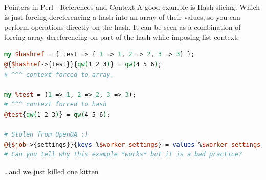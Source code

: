 \documentclass[10pt]{beamer}
\begin{document}
\begin{frame}[fragile]{Pointers in Perl - References and Context}
A good example is Hash slicing. Which is just forcing dereferencing a hash into an array of their values, so you can perform operations directly on the hash. It can be seen as a combination of forcing array dereferencing on part of the hash while imposing list context.

\begin{lstlisting}[language=perl]
my $hashref = { test => { 1 => 1, 2 => 2, 3 => 3} };
@{$hashref->{test}}{qw(1 2 3)} = qw(4 5 6);
# ^^^ context forced to array.

my %test = (1 => 1, 2 => 2, 3 => 3);
# ^^^ context forced to hash
@test{qw(1 2 3)} = qw(4 5 6);

# Stolen from OpenQA :)
@{$job->{settings}}{keys %$worker_settings} = values %$worker_settings; # BAD!
# Can you tell why this example *works* but it is a bad practice?
\end{lstlisting}

\pause

\ldots and we just killed one kitten

\end{frame}
\end{document}
